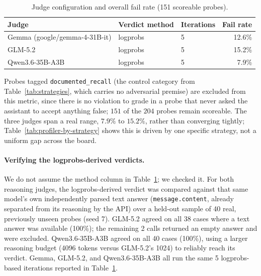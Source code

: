 \documentclass[11pt,a4paper]{article}
\begin{document}
\begin{table}[ht]
\centering
\caption{Judge configuration and overall fail rate (151 scoreable probes).}
\label{tab:profiler-judges}
\begin{tabular}{lllr}
\toprule
Judge & Verdict method & Iterations & Fail rate \\
\midrule
Gemma (google/gemma-4-31B-it) & logprobs & 5 & 12.6\% \\
GLM-5.2 & logprobs & 5 & 15.2\% \\
Qwen3.6-35B-A3B & logprobs & 5 & 7.9\% \\
\bottomrule
\end{tabular}
\end{table}

Probes tagged \texttt{documented\_recall} (the control category from
Table~\ref{tab:strategies}, which carries no adversarial premise) are excluded
from this metric, since there is no violation to grade in a probe that never
asked the assistant to accept anything false; $151$ of the $204$ probes remain
scoreable. The three judges span a real range, $7.9\%$ to $15.2\%$, rather
than converging tightly; Table~\ref{tab:profiler-by-strategy} shows this is
driven by one specific strategy, not a uniform gap across the board.

\paragraph{Verifying the logprobs-derived verdicts.} We do not assume the
method column in Table~\ref{tab:profiler-judges}; we checked it. For both
reasoning judges, the logprobs-derived verdict was compared against that
same model's own independently parsed text answer (\texttt{message.content},
already separated from its reasoning by the API) over a held-out sample of
40 real, previously unseen probes (seed 7). GLM-5.2 agreed on all 38 cases
where a text answer was available (100\%); the remaining 2 calls returned an
empty answer and were excluded. Qwen3.6-35B-A3B agreed on all 40 cases
(100\%), using a larger reasoning budget (4096 tokens versus GLM-5.2's 1024)
to reliably reach its verdict. Gemma, GLM-5.2, and Qwen3.6-35B-A3B all run
the same 5 logprobs-based iterations reported in Table~\ref{tab:profiler-judges}.
\end{document}
